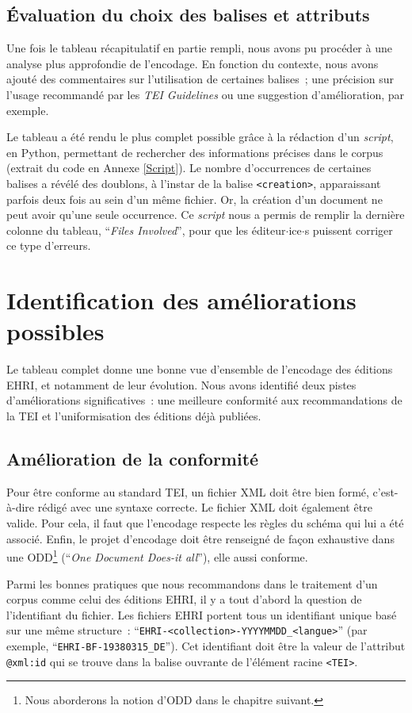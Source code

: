 \subsection{Évaluation du choix des balises et attributs}
Une fois le tableau récapitulatif en partie rempli, nous avons pu procéder à une analyse plus approfondie de l'encodage. En fonction du contexte, nous avons ajouté des commentaires sur l'utilisation de certaines balises~; une précision sur l'usage recommandé par les \textit{TEI Guidelines} ou une suggestion d'amélioration, par exemple.  

Le tableau a été rendu le plus complet possible grâce à la rédaction d'un \textit{script}, en Python, permettant de rechercher des informations précises dans le corpus (extrait du code en Annexe \ref{Script}). Le nombre d'occurrences de certaines balises a révélé des doublons, à l'instar de la balise \texttt{<creation>}, apparaissant parfois deux fois au sein d'un même fichier. Or, la création d'un document ne peut avoir qu'une seule occurrence. Ce \textit{script} nous a permis de remplir la dernière colonne du tableau, \enquote{\textit{Files Involved}}, pour que les éditeur$\cdot$ice$\cdot$s puissent corriger ce type d'erreurs.



\section{Identification des améliorations possibles}
Le tableau complet donne une bonne vue d'ensemble de l'encodage des éditions EHRI, et notamment de leur évolution. Nous avons identifié deux pistes d'améliorations significatives~: une meilleure conformité aux recommandations de la TEI et l'uniformisation des éditions déjà publiées.  

\subsection{Amélioration de la conformité}
Pour être conforme au standard TEI, un fichier XML doit être bien formé, c'est-à-dire rédigé avec une syntaxe correcte. Le fichier XML doit également être valide. Pour cela, il faut que l'encodage respecte les règles du schéma qui lui a été associé. Enfin, le projet d'encodage doit être renseigné de façon exhaustive dans une ODD\footnote{Nous aborderons la notion d'ODD dans le chapitre suivant.} (\enquote{\textit{One Document Does-it all}}), elle aussi conforme.  

Parmi les bonnes pratiques que nous recommandons dans le traitement d'un corpus comme celui des éditions EHRI, il y a tout d'abord la question de l'identifiant du fichier. Les fichiers EHRI portent tous un identifiant unique basé sur une même structure~: \enquote{\texttt{EHRI-<collection>-YYYYMMDD\_{}<langue>}} (par exemple, \enquote{\texttt{EHRI-BF-19380315\_{}DE}}). Cet identifiant doit être la valeur de l'attribut \texttt{@xml:id} qui se trouve dans la balise ouvrante de l'élément racine \texttt{<TEI>}.  

